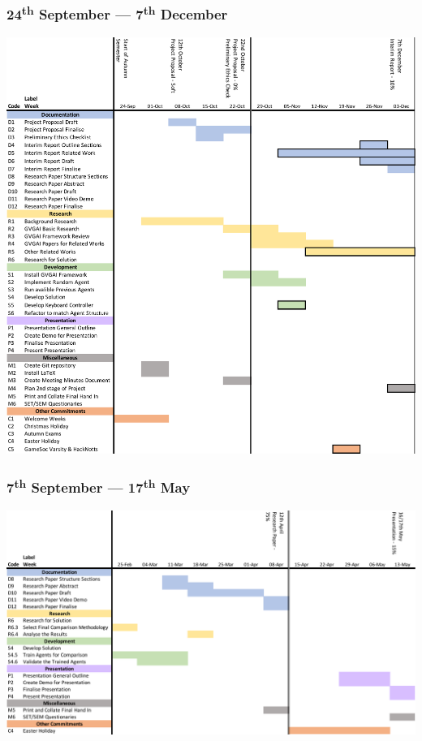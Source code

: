 \documentclass[a4paper]{article}
\begin{document}
\subsubsection{24\textsuperscript{th} September --- 7\textsuperscript{th} December}
\begin{center}
\includegraphics[width=17cm]{workPlan-7Dec.pdf} %
\end{center}
\subsubsection{7\textsuperscript{th} September --- 17\textsuperscript{th} May}
\begin{center}
\includegraphics[width=17cm]{workPlan-17May.pdf} %
\end{center}
\end{document}
